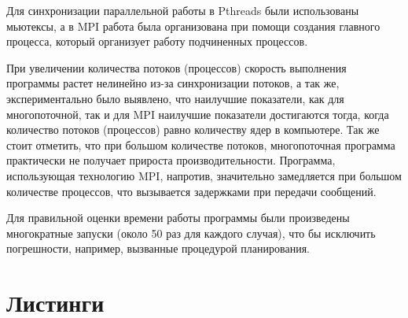 \documentclass[12pt,a4paper]{report}
\begin{document}
				Для синхронизации параллельной работы в Pthreads были использованы 
				мьютексы, а в MPI работа была организована при помощи создания главного 
				процесса,	который организует работу подчиненных процессов.
				
				При увеличении количества потоков (процессов) скорость выполнения 
				программы растет нелинейно из-за синхронизации потоков, а так же, 
				экспериментально было выявлено, что наилучшие показатели, как для 
				многопоточной, так и для MPI наилучшие показатели достигаются тогда, 
				когда количество потоков (процессов) равно количеству ядер в 
				компьютере. Так же стоит отметить, что при большом количестве потоков, 
				многопоточная программа практически не получает прироста 
				производительности. Программа, использующая технологию MPI, напротив, 
				значительно замедляется при большом количестве процессов, что 
				вызывается задержками при передачи сообщений.
				
				Для правильной оценки времени работы программы были произведены 
				многократные запуски (около 50 раз для каждого случая), что бы 
				исключить погрешности, например, вызванные процедурой планирования.
				
			\section{Листинги}

				
			
				
			
\end{document}
